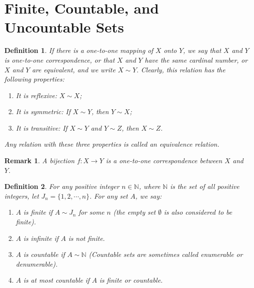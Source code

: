\documentclass[11pt]{book}
\newtheorem{definition}{Definition}[chapter]
\newtheorem{remark}{Remark}[chapter]
\theoremstyle{definition}
\numberwithin{equation}{chapter}
\begin{document}
\medskip

\section{Finite, Countable, and Uncountable Sets}

\begin{definition}
If there is a one-to-one mapping of $X$ onto $Y$, we say that $X$ and $Y$ is one-to-one correspondence, or that $X$ and $Y$ have the same cardinal number, or $X$ and $Y$ are equivalent, and we write $X \sim Y$. Clearly, this relation has the following properties:
\begin{enumerate}[label=(\alph*)]
    \item It is reflexive: $X \sim X$;
    
    \item It is symmetric: If $X \sim Y$, then $Y \sim X$;
    
    \item It is transitive: If $X \sim Y$ and $Y \sim Z$, then $X \sim Z$.
\end{enumerate}
Any relation with these three properties is called an equivalence relation.
\end{definition}

\medskip

\begin{remark}
A bijection $f:X \to Y$ is a one-to-one correspondence between $X$ and $Y$.
\end{remark}

\medskip

\begin{definition}
For any positive integer $n \in \mathbb{N}$, where $\mathbb{N}$ is the set of all positive integers, let $J_n = \{1,2,\cdots,n\}$. For any set $A$, we say:
\begin{enumerate}[label=(\alph*)]
    \item $A$ is finite if $A \sim J_n$ for some $n$ (the empty set $\emptyset$ is also considered to be finite).
    
    \item $A$ is infinite if $A$ is not finite.
    
    \item $A$ is countable if $A \sim \mathbb{N}$ (Countable sets are sometimes called enumerable or denumerable).
    
    \item $A$ is at most countable if $A$ is finite or countable.
\end{enumerate}
\end{definition}
\end{document}
